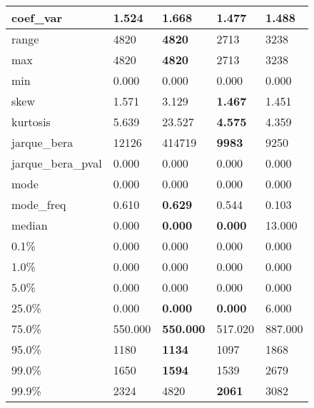\begin{table}[H]
\begin{tabular}{|l|m{10em}|m{10em}|m{10em}|m{10em}|}
\hline coef\_var & 1.524 & \cellcolor[rgb]{0.9, 0.54, 0.52} 1.668 & 1.477 & \bfseries 1.488 \\
\hline range & 4820 & \bfseries 4820 & \cellcolor[rgb]{0.9, 0.54, 0.52} 2713 & 3238 \\
\hline max & 4820 & \bfseries 4820 & \cellcolor[rgb]{0.9, 0.54, 0.52} 2713 & 3238 \\
\hline min & 0.000 & 0.000 & 0.000 & 0.000 \\
\hline skew & 1.571 & \cellcolor[rgb]{0.9, 0.54, 0.52} 3.129 & \bfseries 1.467 & 1.451 \\
\hline kurtosis & 5.639 & \cellcolor[rgb]{0.9, 0.54, 0.52} 23.527 & \bfseries 4.575 & 4.359 \\
\hline jarque\_bera & 12126 & \cellcolor[rgb]{0.9, 0.54, 0.52} 414719 & \bfseries 9983 & 9250 \\
\hline jarque\_bera\_pval & 0.000 & 0.000 & 0.000 & 0.000 \\
\hline mode & 0.000 & 0.000 & 0.000 & 0.000 \\
\hline mode\_freq & 0.610 & \bfseries 0.629 & 0.544 & \cellcolor[rgb]{0.9, 0.54, 0.52} 0.103 \\
\hline median & 0.000 & \bfseries 0.000 & \bfseries 0.000 & \cellcolor[rgb]{0.9, 0.54, 0.52} 13.000 \\
\hline 0.1\% & 0.000 & 0.000 & 0.000 & 0.000 \\
\hline 1.0\% & 0.000 & 0.000 & 0.000 & 0.000 \\
\hline 5.0\% & 0.000 & 0.000 & 0.000 & 0.000 \\
\hline 25.0\% & 0.000 & \bfseries 0.000 & \bfseries 0.000 & \cellcolor[rgb]{0.9, 0.54, 0.52} 6.000 \\
\hline 75.0\% & 550.000 & \bfseries 550.000 & 517.020 & \cellcolor[rgb]{0.9, 0.54, 0.52} 887.000 \\
\hline 95.0\% & 1180 & \bfseries 1134 & 1097 & \cellcolor[rgb]{0.9, 0.54, 0.52} 1868 \\
\hline 99.0\% & 1650 & \bfseries 1594 & 1539 & \cellcolor[rgb]{0.9, 0.54, 0.52} 2679 \\
\hline 99.9\% & 2324 & \cellcolor[rgb]{0.9, 0.54, 0.52} 4820 & \bfseries 2061 & 3082 \\
\hline
\end{tabular}
\end{table}

